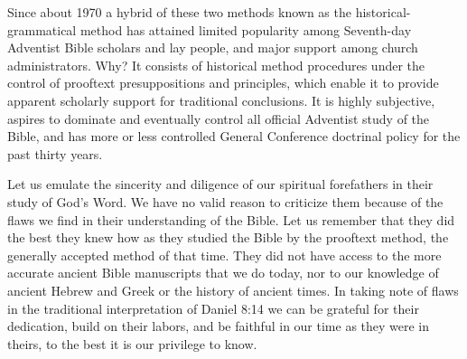 Since about 1970 a hybrid of these two methods known as the
historical-grammatical method\cite{71} has attained limited popularity among
Seventh-day Adventist Bible scholars and lay people, and major support among
church administrators. Why? It consists of historical method procedures
under the control of prooftext presuppositions and principles, which enable
it to provide apparent scholarly support for traditional conclusions. It is
highly subjective, aspires to dominate and eventually control all official
Adventist study of the Bible, and has more or less controlled General
Conference doctrinal policy for the past thirty years.

Let us emulate the sincerity and diligence of our spiritual forefathers in
their study of God's Word. We have no valid reason to criticize them because
of the flaws we find in their understanding of the Bible. Let us remember
that they did the best they knew how as they studied the Bible by the 
prooftext method, the generally accepted method of that time. They did not
have access to the more accurate ancient Bible manuscripts that we do today,
nor to our knowledge of ancient Hebrew and Greek or the history of ancient
times. In taking note of flaws in the traditional interpretation of Daniel
8:14 we can be grateful for their dedication, build on their labors, and be
faithful in our time as they were in theirs, to the best it is our privilege
to know.
